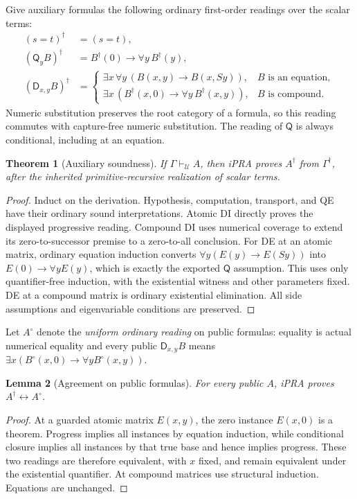 \documentclass[11pt,letterpaper]{article}
\newtheorem{theorem}{Theorem}[section]
\newtheorem{lemma}[theorem]{Lemma}
\theoremstyle{definition}
\newcommand{\D}{\mathsf D}
\newcommand{\Q}{\mathsf Q}
\newcommand{\U}{\mathcal U}
\begin{document}
Give auxiliary formulas the following ordinary first-order readings over
the scalar terms:
\[
 \begin{aligned}
 (s=t)^\dagger&=(s=t),\\
 (\Q_y B)^\dagger&=B^\dagger(0)\to\forall y\,B^\dagger(y),\\
 (\D_{x,y}B)^\dagger&=
 \begin{cases}
 \exists x\,\forall y\,(B(x,y)\to B(x,Sy)),&B\text{ is an equation},\\
 \exists x\,(B^\dagger(x,0)\to\forall y\,B^\dagger(x,y)),
       &B\text{ is compound}.
 \end{cases}
 \end{aligned}
\]
Numeric substitution preserves the root category of a formula, so this
reading commutes with capture-free numeric substitution.  The reading of
$\Q$ is always conditional, including at an equation.

\begin{theorem}[Auxiliary soundness]\label{thm:aux-soundness}
If $\Gamma\vdash_{\U}A$, then iPRA proves $A^\dagger$ from
$\Gamma^\dagger$, after the inherited primitive-recursive realization
of scalar terms.
\end{theorem}
\begin{proof}
Induct on the derivation.  Hypothesis, computation, transport, and QE
have their ordinary sound interpretations.  Atomic DI directly proves
the displayed progressive reading.  Compound DI uses numerical coverage
to extend its zero-to-successor premise to a zero-to-all conclusion.
For DE at an atomic matrix, ordinary equation induction converts
$\forall y(E(y)\to E(Sy))$ into $E(0)\to\forall yE(y)$, which is
exactly the exported $\Q$ assumption.  This uses only quantifier-free
induction, with the existential witness and other parameters fixed.
DE at a compound matrix is ordinary existential elimination.
All side assumptions and eigenvariable conditions are preserved.
\end{proof}

Let $A^\circ$ denote the \emph{uniform ordinary reading} on public
formulas: equality is actual numerical equality and every public
$\D_{x,y}B$ means $\exists x(B^\circ(x,0)\to\forall yB^\circ(x,y))$.

\begin{lemma}[Agreement on public formulas]\label{lem:public-agreement}
For every public $A$, iPRA proves $A^\dagger\leftrightarrow A^\circ$.
\end{lemma}
\begin{proof}
At a guarded atomic matrix $E(x,y)$, the zero instance $E(x,0)$ is a
theorem.  Progress implies all instances by equation induction, while
conditional closure implies all instances by that true base and hence
implies progress.  These two readings are therefore equivalent, with
$x$ fixed, and remain equivalent under the existential quantifier.
At compound matrices use structural induction.  Equations are unchanged.
\end{proof}
\end{document}
